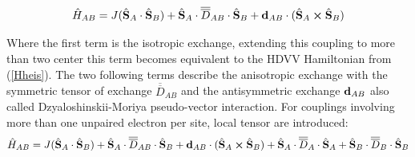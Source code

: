\documentclass[10pt]{report}
\numberwithin{equation}{section}
\begin{document}
\begin{equation}
    \hat{H}_{AB}=J(\hat{\vb S}_A \cdot \hat{\vb S}_B) + \hat{\vb S}_A \cdot\overline{\overline{D}}_{AB} \cdot \hat{\vb S}_B + \vb{d}_{AB} \cdot (\hat{\vb S}_A \cross \hat{\vb S}_B)
\end{equation}

Where the first term is the isotropic exchange, extending this coupling to more than two center this term becomes equivalent to the HDVV Hamiltonian from (\ref{Hheis}).
The two following terms describe the anisotropic exchange with the symmetric tensor of exchange $\overline{\overline{D}}_{AB}$ and the antisymmetric exchange $\vb{d}_{AB}$ also called Dzyaloshinskii-Moriya pseudo-vector interaction.
For couplings involving more than one unpaired electron per site, local tensor are introduced:
\begin{equation}
    \hat{H}_{AB}=J(\hat{\vb S}_A \cdot \hat{\vb S}_B) + \hat{\vb S}_A \cdot\overline{\overline{D}}_{AB} \cdot \hat{\vb S}_B + \vb{d}_{AB} \cdot (\hat{\vb S}_A \cross \hat{\vb S}_B) +\hat{\vb S}_A \cdot\overline{\overline{D}}_{A} \cdot \hat{\vb S}_A +\hat{\vb S}_B \cdot\overline{\overline{D}}_{B} \cdot \hat{\vb S}_B
\end{equation}
\end{document}
